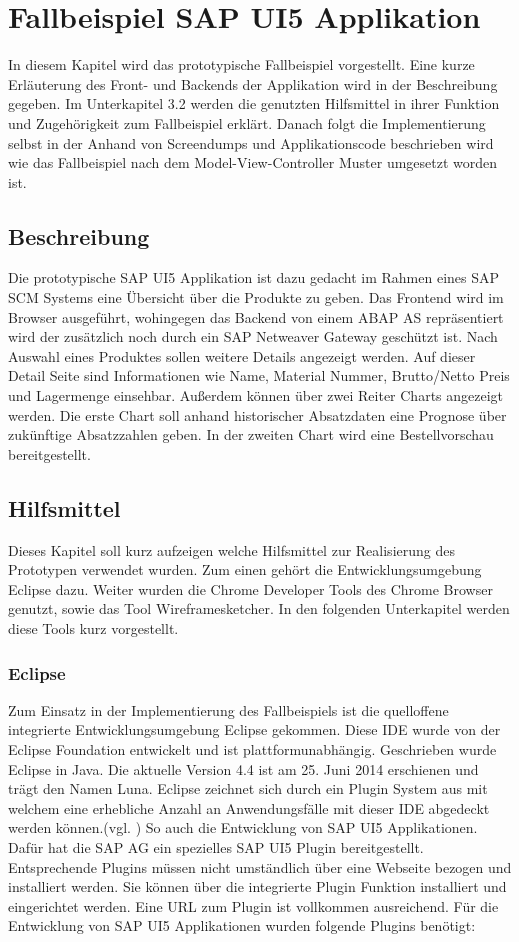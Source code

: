 \section{Fallbeispiel SAP UI5 Applikation}\label{fallbeispiel}
In diesem Kapitel wird das prototypische Fallbeispiel vorgestellt. Eine kurze Erläuterung des Front- und Backends der Applikation wird in der Beschreibung gegeben. Im Unterkapitel 3.2 werden die genutzten Hilfsmittel in ihrer Funktion und Zugehörigkeit zum Fallbeispiel erklärt. Danach folgt die Implementierung selbst in der Anhand von Screendumps und Applikationscode beschrieben wird wie das Fallbeispiel nach dem Model-View-Controller Muster umgesetzt worden ist.

\subsection{Beschreibung}
Die prototypische SAP UI5 Applikation ist dazu gedacht im Rahmen eines SAP SCM Systems eine Übersicht über die Produkte zu geben. Das Frontend wird im Browser ausgeführt, wohingegen das Backend von einem ABAP AS repräsentiert wird der zusätzlich noch durch ein SAP Netweaver Gateway geschützt ist. Nach Auswahl eines Produktes sollen weitere Details angezeigt werden. Auf dieser Detail Seite sind Informationen wie Name, Material Nummer, Brutto/Netto Preis und Lagermenge einsehbar. Außerdem können über zwei Reiter Charts angezeigt werden. Die erste Chart soll anhand historischer Absatzdaten eine Prognose über zukünftige Absatzzahlen geben. In der zweiten Chart wird eine Bestellvorschau bereitgestellt.

\subsection{Hilfsmittel}
Dieses Kapitel soll kurz aufzeigen welche Hilfsmittel zur Realisierung des Prototypen verwendet wurden. Zum einen gehört die Entwicklungsumgebung Eclipse dazu. Weiter wurden die Chrome Developer Tools des Chrome Browser genutzt, sowie das Tool Wireframesketcher. In den folgenden Unterkapitel werden diese Tools kurz vorgestellt.

\subsubsection{Eclipse}
Zum Einsatz in der Implementierung des Fallbeispiels ist die quelloffene integrierte Entwicklungsumgebung Eclipse gekommen. Diese IDE wurde von der Eclipse Foundation entwickelt und ist plattformunabhängig. Geschrieben wurde Eclipse in Java. Die aktuelle Version 4.4 ist am 25. Juni 2014 erschienen und trägt den Namen Luna. Eclipse zeichnet sich durch ein Plugin System aus mit welchem eine erhebliche Anzahl an Anwendungsfälle mit dieser IDE abgedeckt werden können.(vgl. \cite{WikiEclipse2014}) So auch die Entwicklung von SAP UI5 Applikationen. Dafür hat die SAP AG ein spezielles SAP UI5 Plugin bereitgestellt. Entsprechende Plugins müssen nicht umständlich über eine Webseite bezogen und installiert werden. Sie können über die integrierte Plugin Funktion installiert und eingerichtet werden. Eine URL zum Plugin ist vollkommen ausreichend. Für die Entwicklung von SAP UI5 Applikationen wurden folgende Plugins benötigt:
	
